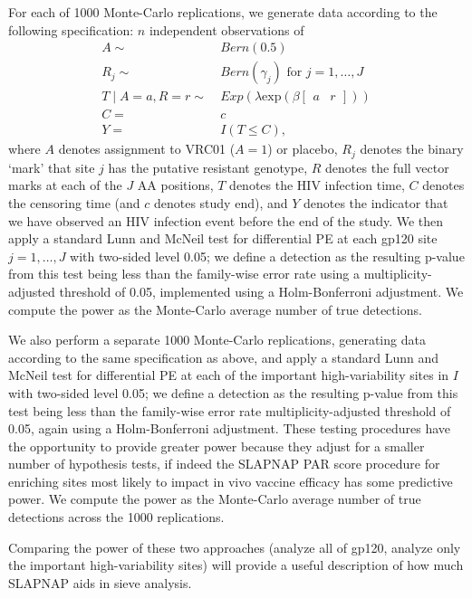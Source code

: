 \documentclass[10pt]{article}
\begin{document}
For each of 1000 Monte-Carlo replications, we generate data according to the following specification: $n$ independent observations of
\begin{align*}
  A \sim & \ Bern(0.5) \\
  R_j \sim & \ Bern(\gamma_j) \text{ for } j = 1, \ldots, J \\
  T \mid A = a, R = r \sim & \ Exp(\lambda\text{exp}(\beta \begin{bmatrix}a & r \end{bmatrix})) \\
  C =& \ c \\
  Y =& \ I(T \leq C),
\end{align*}
where $A$ denotes assignment to VRC01 ($A = 1$) or placebo, $R_j$ denotes the binary `mark' that site $j$ has the putative resistant genotype, $R$ denotes the full vector marks at each of the $J$ AA positions, $T$ denotes the HIV infection time, $C$ denotes the censoring time (and $c$ denotes study end), and $Y$ denotes the indicator that we have observed an HIV infection event before the end of the study.
We then apply a standard Lunn and McNeil test for differential PE at each gp120 site $j = 1, \ldots, J$ with two-sided level 0.05; we define a detection as the resulting p-value from this test being less than the family-wise error rate using a multiplicity-adjusted threshold of 0.05, implemented using a Holm-Bonferroni adjustment. We compute the power as the Monte-Carlo average number of true detections.

We also perform a separate 1000 Monte-Carlo replications, generating data according to the same specification as above, and apply a standard Lunn and McNeil test for differential PE at each of the important high-variability sites in $I$ with two-sided level 0.05; we define a detection as the resulting p-value from this test being less than the family-wise error rate multiplicity-adjusted threshold of 0.05, again using a Holm-Bonferroni adjustment. These testing procedures have the opportunity to provide greater power because they adjust for a smaller number of hypothesis tests, if indeed the SLAPNAP PAR score procedure for enriching sites most likely to impact in vivo vaccine efficacy has some predictive power. We compute the power as the Monte-Carlo average number of true detections across the 1000 replications.

Comparing the power of these two approaches (analyze all of gp120, analyze only the important high-variability sites) will provide a useful description of how much SLAPNAP aids in sieve analysis.
\end{document}
